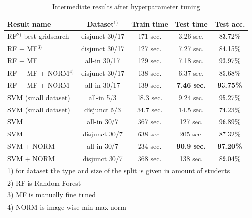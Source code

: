 \documentclass[conference]{IEEEtran}
\begin{document}
\begin{table}[hb!]
    \caption{Intermediate results after hyperparameter tuning}
    \begin{center}
    \setlength{\tabcolsep}{3pt}
    \begin{tabular}{|l|c|c|c|c|}
        \hline
        \textbf{Result name} & \textbf{Dataset$^{1)}$} & \textbf{Train time} & \textbf{Test time} & \textbf{Test acc.} \\
        \hline
        RF$^{2)}$ best gridsearch & disjunct 30/17 & 171 sec. & 3.26 sec. & 83.72\% \\
        \hline
        RF + MF$^{3)}$ & disjunct 30/17 & 127 sec. & 7.27 sec. & 84.15\% \\
        \hline
        RF + MF & all-in 30/17 & 129 sec. & 7.18 sec. & 93.97\% \\
        \hline
        RF + MF + NORM$^{4)}$ & disjunct 30/17 & 138 sec. & 6.37 sec. & 85.68\% \\
        \hline
        RF + MF + NORM & all-in 30/17 & 139 sec. & \textbf{7.46 sec.} & \textbf{93.75\%} \\
        \hline
        SVM (small dataset) & all-in 5/3 & 18.3 sec. & 9.24 sec. & 95.27\% \\
        \hline
        SVM (small dataset) & disjunct 5/3 & 34.7 sec. & 14.5 sec. & 74.23\% \\
        \hline
        SVM  & all-in 30/7 & 367 sec. & 127 sec. & 96.89\% \\
        \hline
        SVM  & disjunct 30/7 & 638 sec. & 205 sec. & 87.32\% \\
        \hline
        SVM + NORM & all-in 30/7 & 234 sec. & \textbf{90.9 sec.} & \textbf{97.20\%} \\
        \hline
        SVM + NORM & disjunct 30/7 & 368 sec. & 138 sec. & 89.04\% \\
        \hline

        \multicolumn{5}{l}{1) for dataset the type and size of the split is given in amount of students } \\
        \multicolumn{5}{l}{2) RF is Random Forest } \\
        \multicolumn{5}{l}{3) MF is manually fine tuned } \\
        \multicolumn{5}{l}{4) NORM is image wise min-max-norm } \\
    \end{tabular}
    \label{table:timeIntermediateResults}
    \end{center}
\end{table}
\end{document}
